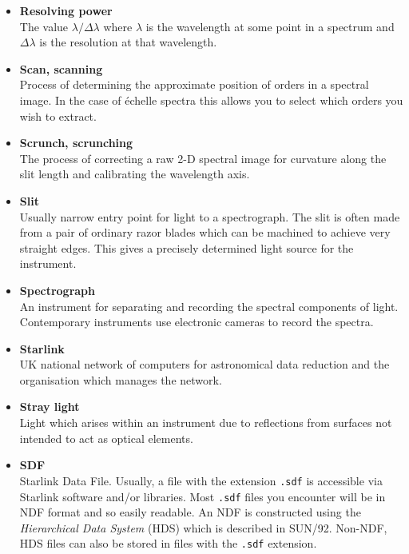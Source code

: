 \documentclass[twoside,11pt]{article}
\newcommand{\htmlref}[2]{#1}
\newcommand{\xref}[3]{#1}
\begin{document}
\begin{itemize}
\item {\bf\label{gl_resolving_power}Resolving power}\\
      The value $\lambda/\Delta\lambda$ where $\lambda$ is the wavelength
      at some point in a spectrum and $\Delta\lambda$ is the resolution
      at that wavelength.

\item {\bf\label{gl_scanning}Scan, scanning}\\
      Process of determining the approximate position of orders in a
      spectral image.  In the case of \'{e}chelle spectra this allows
      you to select which orders you wish to extract.

\item {\bf\label{gl_scrunch}Scrunch, scrunching}\\
      The process of correcting a raw 2-D spectral image for curvature 
      along the slit length and calibrating the wavelength axis.

\item {\bf\label{gl_slit}Slit}\\
      Usually narrow entry point for light to a spectrograph.
      The slit is often made from a pair of ordinary razor blades which can
      be machined to achieve very straight edges.  This gives a precisely
      determined light source for the instrument.

\item {\bf\label{gl_spectrograph}Spectrograph}\\
      An instrument for separating and recording the spectral components of
      light.  Contemporary instruments use electronic cameras to record the
      spectra.

\item {\bf\label{gl_starlink}Starlink}\\
      UK national network of computers for astronomical data reduction
      and the organisation which manages the network.

\item {\bf\label{gl_stray_light}Stray light}\\
      Light which arises within an instrument due to reflections from
      surfaces not intended to act as optical elements.

\item {\bf\label{gl_sdf}SDF}\\
      Starlink Data File.  Usually, a file with the extension \verb+.sdf+
      is accessible via Starlink software and/or libraries.
      Most \verb+.sdf+ files you encounter will be in \htmlref{NDF}{gl_ndf}
      format and so easily readable.  An NDF is constructed using the
      {\sl Hierarchical Data System} (HDS) which is described in
      \xref{SUN/92}{sun92}{}\cite{hds}.
      Non-NDF, HDS files can also be stored in
      files with the \verb+.sdf+ extension.


\end{itemize}
\end{document}
